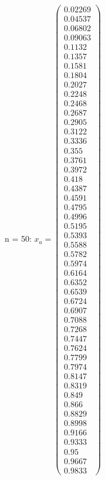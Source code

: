 \documentclass{udpreport}
\begin{document}
\begin{enumerate}
\begin {enumerate}
\begin{enumerate}
\begin{itemize}
\begin{itemize}
				n = 50: $x_{a} = \left(\begin{array}{c} 0.02269\\ 0.04537\\ 0.06802\\ 0.09063\\ 0.1132\\ 0.1357\\ 0.1581\\ 0.1804\\ 0.2027\\ 0.2248\\ 0.2468\\ 0.2687\\ 0.2905\\ 0.3122\\ 0.3336\\ 0.355\\ 0.3761\\ 0.3972\\ 0.418\\ 0.4387\\ 0.4591\\ 0.4795\\ 0.4996\\ 0.5195\\ 0.5393\\ 0.5588\\ 0.5782\\ 0.5974\\ 0.6164\\ 0.6352\\ 0.6539\\ 0.6724\\ 0.6907\\ 0.7088\\ 0.7268\\ 0.7447\\ 0.7624\\ 0.7799\\ 0.7974\\ 0.8147\\ 0.8319\\ 0.849\\ 0.866\\ 0.8829\\ 0.8998\\ 0.9166\\ 0.9333\\ 0.95\\ 0.9667\\ 0.9833 \end{array}\right)$

\end{itemize}
\end{itemize}
\end{enumerate}
\end{enumerate}
\end{enumerate}
\end{document}
